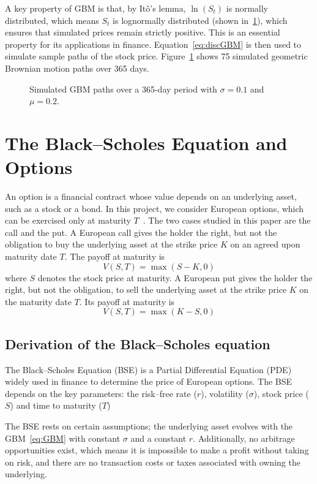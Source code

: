 \documentclass[11pt]{report}
\begin{document}
A key property of GBM is that, by It\^o's lemma, $\ln(S_t)$ is normally distributed, which means $S_t$ is lognormally distributed (shown in~\ref{fig:gbm}), 
which ensures that simulated prices remain strictly positive. This is an essential property for its applications in finance.
Equation~\ref{eq:discGBM} is then used to simulate sample paths of the stock price. Figure~\ref{fig:gbm} shows 75 simulated geometric Brownian motion paths over 365 days.
\begin{figure}[H]
    \centering
    
    \caption{Simulated GBM paths over a 365-day period with $\sigma = 0.1$ and $\mu = 0.2$.}
    \label{fig:gbm}
\end{figure}

\section{The Black--Scholes Equation and Options}\label{sec:BSE}
An option is a financial contract whose value depends on an 
underlying asset, such as a stock or a bond. In this project, 
we consider European options, which can be exercised 
only at maturity $T$~\cite{alma991008708403508046}. 
The two cases studied in this paper are the call and the put.
A European call gives the holder the right, 
but not the obligation to buy the underlying asset 
at the strike price $K$ on an agreed upon maturity date $T$. 
The payoff at maturity is
\begin{equation}
  V(S,T) = \max(S-K,0)
\end{equation}
where $S$ denotes the stock price at maturity.
A European put gives the holder the right, but not the obligation, to sell the underlying asset at the strike price $K$ on the maturity date $T$. Its payoff at maturity is
\begin{equation}
  V(S,T) = \max(K-S,0)
\end{equation}

\subsection{Derivation of the Black--Scholes equation}
The Black--Scholes Equation (BSE) is a 
Partial Differential Equation (PDE) 
widely used in finance to determine the price of European options.
The BSE depends on the key parameters: 
the risk--free rate ($r$), volatility ($\sigma$), 
stock price ($S$) and time to maturity ($T$)

The BSE rests on certain assumptions; the underlying asset evolves with the GBM~\ref{eq:GBM} with constant $\sigma$ and a constant $r$.
Additionally, no arbitrage opportunities exist, which means it is impossible to make a 
profit without taking on risk, and there are no 
transaction costs or taxes associated with owning 
the underlying.
\end{document}
